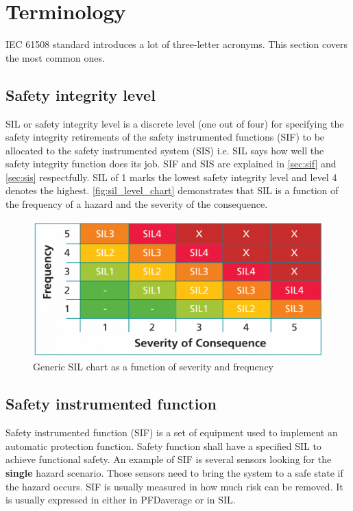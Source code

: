 \section{Terminology}

IEC 61508 standard introduces a lot of three-letter acronyms. This section covers the most common ones.

\subsection{Safety integrity level}

SIL or safety integrity level is a discrete level (one out of four) for specifying the safety integrity retirements of the safety instrumented functions (SIF) to be allocated to the safety instrumented system (SIS) i.e. SIL says how well the safety integrity function does its job. SIF and SIS are explained in \autoref{sec:sif}  and \autoref{sec:sis} respectfully. SIL of 1 marks the lowest safety integrity level and level 4 denotes the highest.  \autoref{fig:sil_level_chart} demonstrates that SIL is a function of the frequency of a hazard and the severity of the consequence. 


\begin{figure}[H]

      \centering
      \includegraphics[width=0.7\linewidth]{images/sil_level_chart.png}
      \caption{Generic SIL chart as a function of severity and frequency}
      \label{fig:sil_level_chart}
    
\end{figure}

\subsection{Safety instrumented function}
\label{sec:sif}

Safety instrumented function (SIF) is a set of equipment used to implement an automatic protection function. Safety function shall have a specified SIL to achieve functional safety. 
An example of SIF is several sensors looking for the \textbf{single} hazard scenario. Those sensors need to bring the system to a safe state if the hazard occurs. SIF is usually measured in how much risk can be removed. It is usually expressed in either in PFDaverage or in SIL. 

